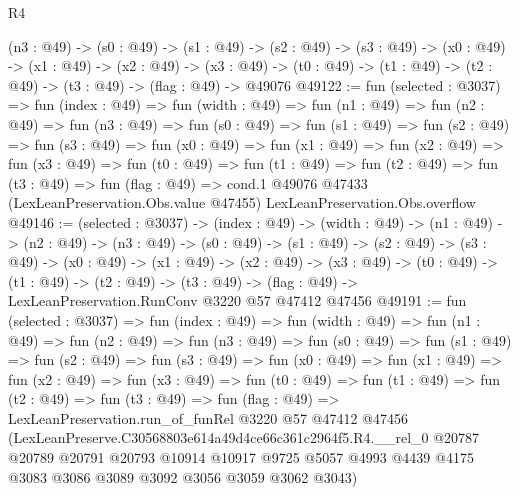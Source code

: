 \begin{lexlean}{R4}
\begin{coremodule}
  (n3 : @49) ->
  (s0 : @49) ->
  (s1 : @49) ->
  (s2 : @49) ->
  (s3 : @49) ->
  (x0 : @49) ->
  (x1 : @49) ->
  (x2 : @49) ->
  (x3 : @49) -> (t0 : @49) -> (t1 : @49) -> (t2 : @49) -> (t3 : @49) -> (flag : @49) -> @49076
@49122 := fun (selected : @3037) =>
  fun (index : @49) =>
  fun (width : @49) =>
  fun (n1 : @49) =>
  fun (n2 : @49) =>
  fun (n3 : @49) =>
  fun (s0 : @49) =>
  fun (s1 : @49) =>
  fun (s2 : @49) =>
  fun (s3 : @49) =>
  fun (x0 : @49) =>
  fun (x1 : @49) =>
  fun (x2 : @49) =>
  fun (x3 : @49) =>
  fun (t0 : @49) =>
  fun (t1 : @49) =>
  fun (t2 : @49) =>
  fun (t3 : @49) =>
  fun (flag : @49) =>
  cond.{1} @49076 @47433 (LexLeanPreservation.Obs.value @47455) LexLeanPreservation.Obs.overflow
@49146 := (selected : @3037) ->
  (index : @49) ->
  (width : @49) ->
  (n1 : @49) ->
  (n2 : @49) ->
  (n3 : @49) ->
  (s0 : @49) ->
  (s1 : @49) ->
  (s2 : @49) ->
  (s3 : @49) ->
  (x0 : @49) ->
  (x1 : @49) ->
  (x2 : @49) ->
  (x3 : @49) ->
  (t0 : @49) ->
  (t1 : @49) ->
  (t2 : @49) -> (t3 : @49) -> (flag : @49) -> LexLeanPreservation.RunConv @3220 @57 @47412 @47456
@49191 := fun (selected : @3037) =>
  fun (index : @49) =>
  fun (width : @49) =>
  fun (n1 : @49) =>
  fun (n2 : @49) =>
  fun (n3 : @49) =>
  fun (s0 : @49) =>
  fun (s1 : @49) =>
  fun (s2 : @49) =>
  fun (s3 : @49) =>
  fun (x0 : @49) =>
  fun (x1 : @49) =>
  fun (x2 : @49) =>
  fun (x3 : @49) =>
  fun (t0 : @49) =>
  fun (t1 : @49) =>
  fun (t2 : @49) =>
  fun (t3 : @49) =>
  fun (flag : @49) =>
  LexLeanPreservation.run_of_funRel
    @3220
    @57
    @47412
    @47456
    (LexLeanPreserve.C30568803e614a49d4ce66c361c2964f5.R4.__rel_0
      @20787
      @20789
      @20791
      @20793
      @10914
      @10917
      @9725
      @5057
      @4993
      @4439
      @4175
      @3083
      @3086
      @3089
      @3092
      @3056
      @3059
      @3062
      @3043)
\end{coremodule}
\end{lexlean}
